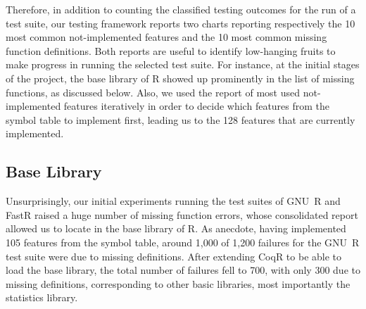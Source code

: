 \documentclass[
    sigplan,
    10pt,
    review, %
    natbib=false %
 ]{acmart}
\newcommand\et[1]{\todo[color=blue!20,size=\scriptsize]{#1}}
\newcommand\td[1]{\todo[color=green!20,size=\scriptsize]{#1}}
\newcommand\CoqR{CoqR}
\begin{document}
Therefore, in addition to counting the classified testing outcomes for the run of a test suite, our testing framework reports two charts reporting respectively the 10 most common not-implemented features and the 10 most common missing function definitions. Both reports are useful to identify low-hanging fruits to make progress in running the selected test suite. For instance, at the initial stages of the project, the base library of R showed up prominently in the list of missing functions, as discussed below.
Also, we used the report of most used not-implemented features iteratively in order to decide which features from the symbol table to implement first, leading us to the 128 features that are currently implemented.
%





\subsection{Base Library}
\label{sec:library}





Unsurprisingly, our initial experiments running the test suites of GNU~R and FastR raised a huge number of missing function errors, whose consolidated report allowed us to locate in the base library of R. As anecdote, having implemented 105 features from the symbol table, around 1,000 of 1,200 failures
for the GNU~R test suite were due to missing definitions.
After extending \CoqR{} to be able to load the base library, the total number of failures fell to 700, with only 300 due to missing definitions, corresponding to other basic libraries, most importantly the statistics library.
\end{document}
